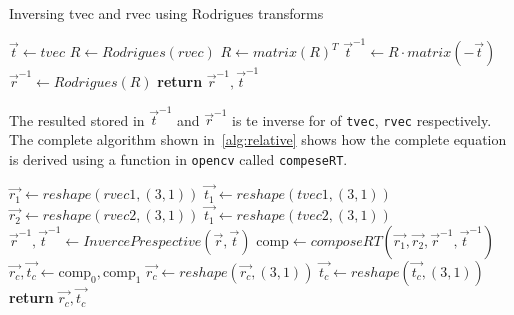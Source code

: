 \begin{algorithm}
    \caption{Inversing tvec and rvec using Rodrigues transforms}\label{alg:inverse}
    \begin{algorithmic}[1]
        \State $\vec{t} \gets tvec$
        \State $R \gets Rodrigues(rvec)$ 
        \State $R \gets matrix(R)^{T}$ 
        \State $\vec{t}^{-1} \gets R \cdot matrix(-\vec{t})$ 
        \State $\vec{r}^{-1} \gets Rodrigues(R)$ 
        \State \textbf{return} $\vec{r}^{-1}, \vec{t}^{-1}$ 
        \EndProcedure
    \end{algorithmic}
\end{algorithm}
The resulted stored in $\vec{t}^{-1}$ and $\vec{r}^{-1}$ is te inverse for of \verb|tvec|, \verb|rvec| respectively.
The complete algorithm shown in~\ref{alg:relative} shows how the complete equation is derived using a function in \verb|opencv| called \verb|compeseRT|.

\begin{algorithm}
    \begin{algorithmic}[1]
        \State $\vec{r_1} \gets reshape(rvec1, (3,1))$ 
        \State $\vec{t_1} \gets reshape(tvec1, (3,1))$
        \State $\vec{r_2} \gets reshape(rvec2, (3,1))$
        \State $\vec{t_1} \gets reshape(tvec2, (3,1))$
        \State $\vec{r}^{-1}, \vec{t}^{-1} \gets InvercePrespective(\vec{r}, \vec{t})$
        \State $\text{comp} \gets composeRT(\vec{r_1}, \vec{r_2}, \vec{r}^{-1}, \vec{t}^{-1})$
        \State $\vec{r_{c}}, \vec{t_{c}} \gets \text{comp}_0, \text{comp}_1$
        \State $\vec{r_{c}} \gets reshape(\vec{r_{c}}, (3,1))$
        \State $\vec{t_{c}} \gets reshape(\vec{t_{c}}, (3,1))$
        \State \textbf{return} $\vec{r_{c}},\vec{t_{c}}$
        \EndProcedure
    \end{algorithmic}
\end{algorithm}


